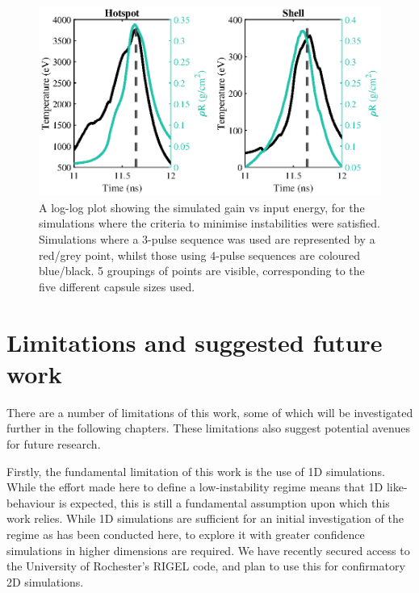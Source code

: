 \begin{figure}[ht]
\centering
\includegraphics{figures/LowCR/RhoRandT.eps}
\caption{A log-log plot showing the simulated gain vs input energy, for the simulations where the criteria to minimise instabilities were satisfied. Simulations where a 3-pulse sequence was used are represented by a red/grey point, whilst those using 4-pulse sequences are coloured blue/black. 5 groupings of points are visible, corresponding to the five different capsule sizes used.}
\label{fig:HSandShellLMJ}
\end{figure}


\section{Limitations and suggested future work} \label{sec: LowCRLimitations}
There are a number of limitations of this work, some of which will be investigated further in the following chapters. These limitations also suggest potential avenues for future research.

Firstly, the fundamental limitation of this work is the use of 1D simulations. While the effort made here to define a low-instability regime means that 1D like-behaviour is expected, this is still a fundamental assumption upon which this work relies. While 1D simulations are sufficient for an initial investigation of the regime as has been conducted here, to explore it with greater confidence simulations in higher dimensions are required. We have recently secured access to the University of Rochester's RIGEL code, and plan to use this for confirmatory 2D simulations.

